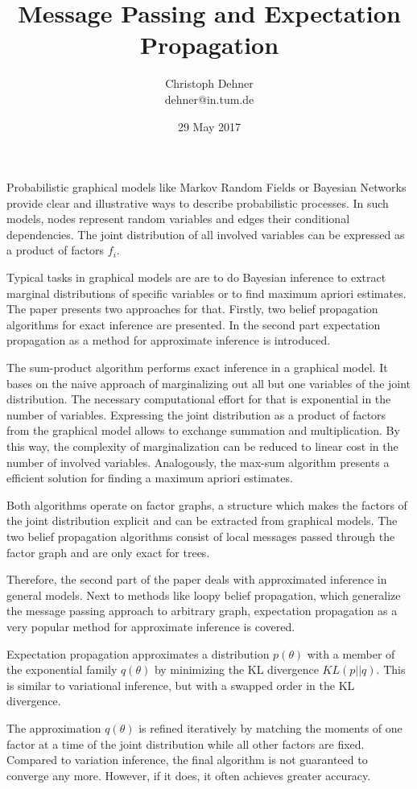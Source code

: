 \documentclass{article}
\title{Message Passing and Expectation Propagation}
\author{Christoph Dehner\\ dehner@in.tum.de}
\date{29 May 2017}
\begin{document}
\maketitle


Probabilistic graphical models like Markov Random Fields or Bayesian Networks provide clear and illustrative ways to describe probabilistic processes. In such models, nodes represent random variables and edges their conditional dependencies. The joint distribution of all involved variables can be expressed as a product of factors $f_i$.

Typical tasks in graphical models are are to do Bayesian inference to extract marginal distributions of specific variables or to find maximum apriori estimates. The paper presents two approaches for that. Firstly, two belief propagation algorithms for exact inference are presented. In the second part expectation propagation as a method for approximate inference is introduced.

The sum-product algorithm performs exact inference in a graphical model. It bases on the naive approach of marginalizing out all but one variables of the joint distribution. The necessary computational effort for that is exponential in the number of variables. Expressing the joint distribution as a product of factors from the graphical model allows to exchange summation and multiplication. By this way, the complexity of marginalization can be reduced to linear cost in the number of involved variables. Analogously, the max-sum algorithm presents a efficient solution for finding a maximum apriori estimates. 

Both algorithms operate on factor graphs, a structure which makes the factors of the joint distribution explicit and can be extracted from graphical models. The two belief propagation algorithms consist of local messages passed through the factor graph and are only exact for trees.

Therefore, the second part of the paper deals with approximated inference in general models. Next to methods like loopy belief propagation, which generalize the message passing approach to arbitrary graph, expectation propagation as a very popular method for approximate inference is covered.

Expectation propagation approximates a distribution $p(\theta)$ with a member of the exponential family $q(\theta)$ by minimizing the KL divergence $KL(p||q)$. This is similar to variational inference, but with a swapped order in the KL divergence.

The approximation $q(\theta)$ is refined iteratively by matching the moments of one factor at a time of the joint distribution while all other factors are fixed. Compared to variation inference, the final algorithm is not guaranteed to converge any more. However, if it does, it often achieves greater accuracy. 
\end{document}
